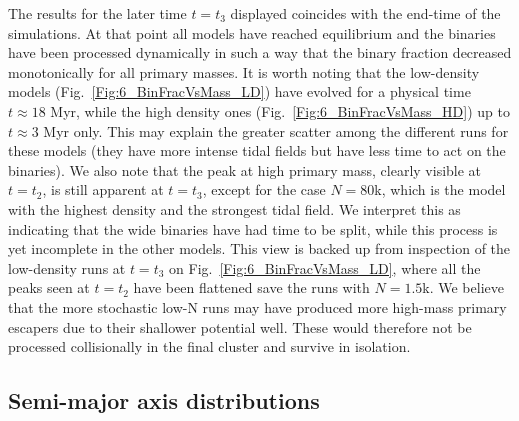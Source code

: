 The results for the later time $t = t_3$ displayed coincides with the end-time of the simulations. At that point all models have reached equilibrium and the binaries have been processed dynamically in such a way that the binary fraction decreased monotonically for all primary masses. It is worth noting that the low-density models (Fig.~\ref{Fig:6_BinFracVsMass_LD}) have evolved for a physical time $t \approx 18$ Myr, while the high density ones  (Fig.~\ref{Fig:6_BinFracVsMass_HD}) up to $t \approx 3$ Myr only. This may explain the greater scatter among the different runs for these models (they have more intense tidal fields but have less time to act on the binaries). We also note that the peak at high primary mass, clearly visible at $t = t_2$, is still apparent at $t = t_3$, except for the case $N = 80$k, which is the model with the highest density and the strongest tidal field. We interpret this as indicating that the wide binaries have had time to be split, while this process is yet incomplete in the other models. This view is backed up from inspection of the low-density runs at $t= t_3$ on Fig.~\ref{Fig:6_BinFracVsMass_LD}, where all the peaks seen at $t = t_2$ have been flattened save the runs with $N = 1.5$k. We believe that the more stochastic low-N runs may have produced more high-mass primary escapers due to their shallower potential well. These would therefore not be processed collisionally in the final cluster and survive in isolation. 



\subsection{Semi-major axis distributions}

